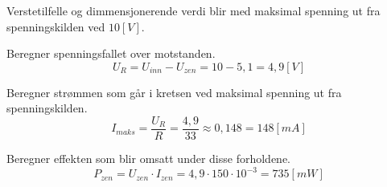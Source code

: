 \vspace{0.5cm} %

\begin{solution}[name=Løsningsforslag oppgave]
Verstetilfelle og dimmensjonerende verdi blir med maksimal spenning ut fra spenningskilden ved $10 [V]$.

Beregner spenningsfallet over motstanden.
\[U_R=U_{inn}-U_{zen}=10-5,1=4,9[V]\]
	
Beregner strømmen som går i kretsen ved maksimal spenning ut fra spenningskilden.
\[I_{maks}=\frac{U_R}{R}=\frac{4,9}{33} \approx0,148 = 148 [mA]\]

Beregner effekten som blir omsatt under disse forholdene.
\[P_{zen}=U_{zen}\cdot I_{zen}= 4,9\cdot 150\cdot 10^{-3}=735[mW]\]
	
\end{solution}



\begin{question}[name=Oppgave, topic=zenerdioder]
	
\end{question}

\vspace{0.5cm} %

\begin{solution}[name=Løsningsforslag oppgave]
	
	
\end{solution}



\begin{question}[name=Oppgave, topic=zenerdioder]
	
\end{question}

\vspace{0.5cm} %

\begin{solution}[name=Løsningsforslag oppgave]
	
	
\end{solution}



\begin{question}[name=Oppgave, topic=zenerdioder]
	
\end{question}

\vspace{0.5cm} %

\begin{solution}[name=Løsningsforslag oppgave]
	
	
\end{solution}



